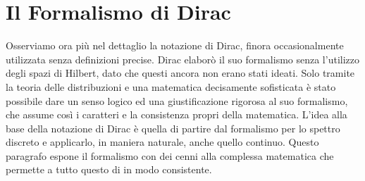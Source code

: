 \documentclass[../../FisicaTeorica.tex]{subfiles}
\begin{document}
\section{Il Formalismo di Dirac}
Osserviamo ora più nel dettaglio la notazione di Dirac, finora occasionalmente utilizzata senza definizioni precise.
Dirac elaborò il suo formalismo senza l'utilizzo degli spazi di Hilbert, dato che questi ancora non erano stati ideati. Solo tramite la teoria delle distribuzioni e una matematica decisamente sofisticata è stato possibile dare un senso logico ed una giustificazione rigorosa al suo formalismo, che assume così i caratteri e la consistenza propri della matematica. L'idea alla base della notazione di Dirac è quella di partire dal formalismo per lo spettro discreto e applicarlo, in maniera naturale, anche quello continuo. Questo paragrafo espone il formalismo con dei cenni alla complessa matematica che permette a tutto questo di  in modo consistente.\\
\end{document}
